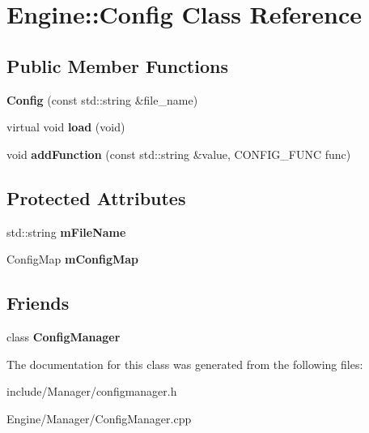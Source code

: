 \hypertarget{classEngine_1_1Config}{}\section{Engine\+:\+:Config Class Reference}
\label{classEngine_1_1Config}
\subsection*{Public Member Functions}
\begin{DoxyCompactItemize}
\item 
\hypertarget{classEngine_1_1Config_aedb3f3bcd87a7d860bb00f3480ce61d3}{}{\bfseries Config} (const std\+::string \&file\+\_\+name)\label{classEngine_1_1Config_aedb3f3bcd87a7d860bb00f3480ce61d3}

\item 
\hypertarget{classEngine_1_1Config_a86838f5990d86836d1d33d68c33f1b83}{}virtual void {\bfseries load} (void)\label{classEngine_1_1Config_a86838f5990d86836d1d33d68c33f1b83}

\item 
\hypertarget{classEngine_1_1Config_a55c0b956008149bc059afa6f9ff78a67}{}void {\bfseries add\+Function} (const std\+::string \&value, C\+O\+N\+F\+I\+G\+\_\+\+F\+U\+N\+C func)\label{classEngine_1_1Config_a55c0b956008149bc059afa6f9ff78a67}

\end{DoxyCompactItemize}
\subsection*{Protected Attributes}
\begin{DoxyCompactItemize}
\item 
\hypertarget{classEngine_1_1Config_a4a6bd1120b3e16a684c1647ebc51cab3}{}std\+::string {\bfseries m\+File\+Name}\label{classEngine_1_1Config_a4a6bd1120b3e16a684c1647ebc51cab3}

\item 
\hypertarget{classEngine_1_1Config_a98196653c44474724605aa4e321edcb6}{}Config\+Map {\bfseries m\+Config\+Map}\label{classEngine_1_1Config_a98196653c44474724605aa4e321edcb6}

\end{DoxyCompactItemize}
\subsection*{Friends}
\begin{DoxyCompactItemize}
\item 
\hypertarget{classEngine_1_1Config_aed8714396345e5fc5b1a2bf7ccaed500}{}class {\bfseries Config\+Manager}\label{classEngine_1_1Config_aed8714396345e5fc5b1a2bf7ccaed500}

\end{DoxyCompactItemize}


The documentation for this class was generated from the following files\+:\begin{DoxyCompactItemize}
\item 
include/\+Manager/configmanager.\+h\item 
Engine/\+Manager/Config\+Manager.\+cpp\end{DoxyCompactItemize}
